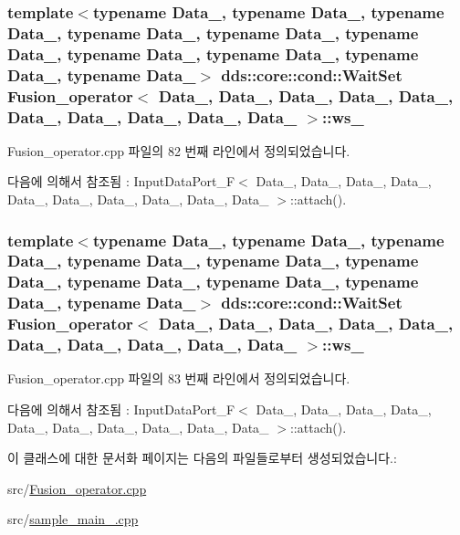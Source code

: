 \subsubsection[{\texorpdfstring{ws\+\_\+7}{ws_7}}]{\setlength{\rightskip}{0pt plus 5cm}template$<$typename Data\+\_, typename Data\+\_, typename Data\+\_, typename Data\+\_, typename Data\+\_, typename Data\+\_, typename Data\+\_, typename Data\+\_, typename Data\+\_, typename Data\+\_$>$ dds\+::core\+::cond\+::\+Wait\+Set {\bf Fusion\+\_\+operator}$<$ Data\+\_, Data\+\_, Data\+\_, Data\+\_, Data\+\_, Data\+\_, Data\+\_, Data\+\_, Data\+\_, Data\+\_ $>$\+::ws\+\_}\hypertarget{classFusion__operator_a0c468d5a6c0fb3b6adf93372ca678c65}{}\label{classFusion__operator_a0c468d5a6c0fb3b6adf93372ca678c65}


Fusion\+\_\+operator.\+cpp 파일의 82 번째 라인에서 정의되었습니다.



다음에 의해서 참조됨 \+:  Input\+Data\+Port\+\_\+\+F$<$ Data\+\_, Data\+\_, Data\+\_, Data\+\_, Data\+\_, Data\+\_, Data\+\_, Data\+\_, Data\+\_, Data\+\_ $>$\+::attach().

\subsubsection[{\texorpdfstring{ws\+\_\+8}{ws_8}}]{\setlength{\rightskip}{0pt plus 5cm}template$<$typename Data\+\_, typename Data\+\_, typename Data\+\_, typename Data\+\_, typename Data\+\_, typename Data\+\_, typename Data\+\_, typename Data\+\_, typename Data\+\_, typename Data\+\_$>$ dds\+::core\+::cond\+::\+Wait\+Set {\bf Fusion\+\_\+operator}$<$ Data\+\_, Data\+\_, Data\+\_, Data\+\_, Data\+\_, Data\+\_, Data\+\_, Data\+\_, Data\+\_, Data\+\_ $>$\+::ws\+\_}\hypertarget{classFusion__operator_a07930a190539ebefac664cc34d81dbe8}{}\label{classFusion__operator_a07930a190539ebefac664cc34d81dbe8}


Fusion\+\_\+operator.\+cpp 파일의 83 번째 라인에서 정의되었습니다.



다음에 의해서 참조됨 \+:  Input\+Data\+Port\+\_\+\+F$<$ Data\+\_, Data\+\_, Data\+\_, Data\+\_, Data\+\_, Data\+\_, Data\+\_, Data\+\_, Data\+\_, Data\+\_ $>$\+::attach().



이 클래스에 대한 문서화 페이지는 다음의 파일들로부터 생성되었습니다.\+:\begin{DoxyCompactItemize}
\item 
src/\hyperlink{Fusion__operator_8cpp}{Fusion\+\_\+operator.\+cpp}\item 
src/\hyperlink{sample__main__2_8cpp}{sample\+\_\+main\+\_.\+cpp}\end{DoxyCompactItemize}
